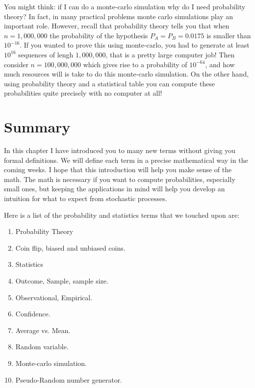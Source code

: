 \documentclass{report}
\theoremstyle{plain}
\theoremstyle{definition}
\begin{document}
You might think: if I can do a monte-carlo simulation why do I need
probability theory? In fact, in many practical problems monte carlo
simulations play an important role. However, recall that probability
theory tells you that when $n=1,000,000$ the probability of the
hypothesis $P_A=P_B=0.0175$ is smaller than $10^{-16}$. If you wanted
to prove this using monte-carlo, you had to generate at least
$10^{16}$ sequences of lengh $1,000,000$, that is a pretty large
computer job! Then consider $n=100,000,000$ which gives rise to a
probability of $10^{-64}$, and how much resources will is take to do
this monte-carlo simulation. On the other hand, using probability
theory and a statistical table you can compute these probabilities
quite precisely with no computer at all!


\section{Summary}

In this chapter I have introduced you to many new terms without giving
you formal definitions. We will define each term in a precise
mathematical way in the coming weeks. I hope that this introduction
will help you make sense of the math. The math is necessary if you
want to compute probabilities, especially small ones, but keeping the
applications in mind will help you develop an intuition for what to
expect from stochastic processes.

Here is a list of the probability and statistics terms that we touched
upon are:
\begin{enumerate}
\item Probability Theory
\item Coin flip, biased and unbiased coins.
\item Statistics
\item Outcome, Sample, sample size.
\item Observational, Empirical.
\item Confidence.
\item Average vs. Mean.
\item Random variable.
\item Monte-carlo simulation.
\item Pseudo-Random number generator.
\end{enumerate}
\end{document}

